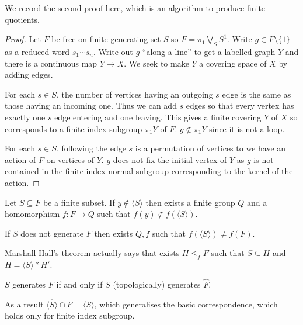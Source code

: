 \documentclass[a4paper]{article}
\begin{document}
We record the second proof here, which is an algorithm to produce finite quotients.

\begin{proof}
  Let \(F\) be free on finite generating set \(S\) so \(F = \pi_1 \bigvee_S S^1\). Write \(g \in F \setminus \{1\}\) as a reduced word \(s_1 \cdots s_n\).  Write out \(g\) ``along a line'' to get a labelled graph \(Y\) and there is a continuous map \(Y \to X\). We seek to make \(Y\) a covering space of \(X\) by adding edges.

  For each \(s \in S\), the number of vertices having an outgoing \(s\) edge is the same as those having an incoming one. Thus we can add \(s\) edges so that every vertex has exactly one \(s\) edge entering and one leaving. This gives a finite covering \(\overline Y\) of \(X\) so corresponds to a finite index subgroup \(\pi_1\overline Y\) of \(F\). \(g \notin \pi_1 \overline Y\) since it is not a loop.

  For each \(s \in S\), following the edge \(s\) is a permutation of vertices to we have an action of \(F\) on vertices of \(Y\). \(g\) does not fix the initial vertex of \(Y\) as \(g\) is not contained in the finite index normal subgroup corresponding to the kernel of the action.
\end{proof}

\begin{theorem}
  Let \(S \subseteq F\) be a finite subset. If \(y \notin \langle S\rangle\) then exists a finite group \(Q\) and a homomorphism \(f: F \to Q\) such that \(f(y) \notin f(\langle S\rangle)\).
\end{theorem}

\begin{corollary}
  If \(S\) does not generate \(F\) then exists \(Q, f\) such that \(f(\langle S\rangle) \ne f(F)\).
\end{corollary}

\begin{remark}
  Marshall Hall's theorem actually says that exists \(H \leq_f F\) such that \(S \subseteq H\) and \(H = \langle S \rangle * H'\).
\end{remark}

\begin{corollary}
  \(S\) generates \(F\) if and only if \(S\) (topologically) generates \(\hat F\).
\end{corollary}

\begin{note}
  As a result \(\overline{\langle S\rangle} \cap F = \langle S\rangle\), which generalises the basic correspondence, which holds only for finite index subgroup.
\end{note}
\end{document}

